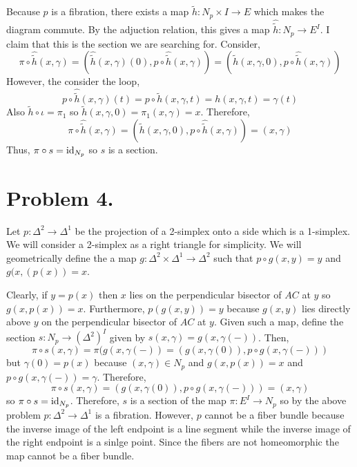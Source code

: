 \documentclass[12pt]{extarticle}
\begin{document}
Because $p$ is a fibration, there exists a map $\tilde{h} : N_p \times I \to E$ which makes the diagram commute. By the adjuction relation, this gives a map $\hat{\tilde{h}} : N_p \to E^I$. I claim that this is the section we are searching for. Consider,
\[ \pi \circ \hat{\tilde{h}}(x, \gamma) = (\hat{\tilde{h}}(x, \gamma)(0), p \circ \hat{\tilde{h}}(x, \gamma)) = (\tilde{h}(x, \gamma, 0), p \circ \hat{\tilde{h}}(x, \gamma)) \] 
However, the consider the loop,
\[ p \circ \hat{\tilde{h}}(x, \gamma)(t) = p \circ \tilde{h}(x, \gamma, t) = h(x, \gamma, t) = \gamma(t) \]
Also $\tilde{h} \circ \iota = \pi_1$ so $\tilde{h}(x, \gamma, 0) = \pi_1(x, \gamma) = x$. Therefore,
\[ \pi \circ \hat{\tilde{h}}(x, \gamma) = (\tilde{h}(x, \gamma, 0), p \circ \hat{\tilde{h}}(x, \gamma)) = (x, \gamma) \] 
Thus, $\pi \circ s = \mathrm{id}_{N_p}$ so $s$ is a section.

\section*{Problem 4.}

Let $p : \Delta^2 \to \Delta^1$ be the projection of a 2-simplex onto a side which is a 1-simplex. We will consider a 2-simplex as a right triangle for simplicity.
We will geometrically define the a map $g : \Delta^2 \times \Delta^1 \to \Delta^2$ such that $p \circ g(x, y) = y$ and $g(x, (p(x)) = x$.

\begin{center} 
\end{center}
Clearly, if $y = p(x)$ then $x$ lies on the perpendicular bisector of $AC$ at $y$ so $g(x, p(x)) = x$. Furthermore, $p(g(x,y)) = y$ because $g(x,y)$ lies directly above $y$ on the perpendicular bisector of $AC$ at $y$.
Given such a map, define the section $s : N_p \to  (\Delta^2)^I$ given by $s(x, \gamma) = g(x, \gamma(-))$. Then,
\[ \pi \circ s(x, \gamma) = \pi(g(x, \gamma(-)) = (g(x, \gamma(0)), p \circ g(x, \gamma(-))) \]
but $\gamma(0) = p(x)$ because $(x, \gamma) \in N_p$ and $g(x, p(x)) = x$ and $p \circ g(x, \gamma(-)) = \gamma$. Therefore,
\[ \pi \circ s(x, \gamma) = (g(x, \gamma(0)), p \circ g(x, \gamma(-))) = (x, \gamma) \]
so $\pi \circ s = \mathrm{id}_{N_p}$. Therefore, $s$ is a section of the map $\pi : E^I \to N_p$ so by the above problem $p : \Delta^2 \to \Delta^1$ is a fibration. However, $p$ cannot be a fiber bundle because the inverse image of the left endpoint is a line segment while the inverse image of the right endpoint is a sinlge point. Since the fibers are not homeomorphic the map cannot be a fiber bundle.  
\end{document}

